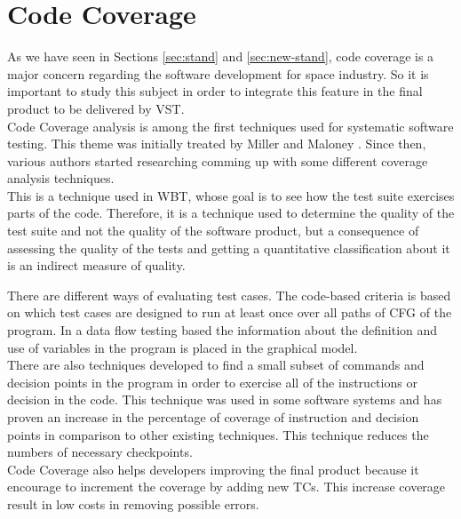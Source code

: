 \section{Code Coverage}\label{sec:ccoverage}
As we have seen in Sections \ref{sec:stand} and \ref{sec:new-stand}, code coverage is a major concern regarding the software development for space industry.
So it is important to study this subject in order to integrate this feature in the final product to be delivered by \ac{VST}.\\

Code Coverage analysis is among the first techniques used for systematic software testing.
This theme was initially treated by Miller and Maloney \cite{Miller:1963:SMA:366246.366248}.
Since then, various authors started researching comming up with some different coverage analysis techniques.\\
This is a technique used in \ac{WBT}, whose goal is to see how the test suite exercises parts of the code.
Therefore, it is a technique used to determine the quality of the test suite and not the quality of the software product, but a consequence
of assessing the quality of the tests and getting a quantitative classification about it is an indirect measure of quality\cite{ccoverage}.

There are different ways of evaluating test cases.
The code-based criteria is based on which test cases are designed to run at least once over all paths of \ac{CFG} of the program.
In a data flow testing based the information about the definition and use of variables in the program is placed in the graphical model\cite{Gokhale:2005:DCC:1090955.1092172}.\\
There are also techniques developed to find a small subset of commands and decision points in the program in order to exercise all of the
instructions or decision in the code.
This technique was used in some software systems and has proven an increase in the percentage of coverage of instruction and decision points in
comparison to other existing techniques. This technique reduces the numbers of necessary checkpoints\cite{Agrawal:1999:ECT:381788.316166}.\\
Code Coverage also helps developers improving the final product because it encourage to increment the coverage by adding new \ac{TC}s.
This increase coverage result in low costs in removing possible errors\cite{Piwowarski:1993:CME:257572.257635}.

